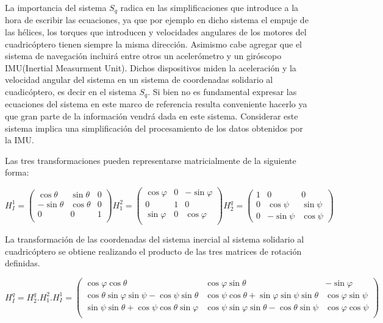 \documentclass[main]{subfiles}
\begin{document}
La importancia del sistema $S_q$ radica en las simplificaciones que introduce a la hora de escribir las ecuaciones, ya que por ejemplo en dicho sistema el empuje de las h\'elices, los torques que introducen y velocidades angulares de los motores del cuadric\'optero tienen siempre la misma direcci\'on. Asimismo cabe agregar que el sistema de navegaci\'on incluir\'a entre otros un aceler\'ometro y un gir\'oscopo IMU(Inertial Measurment Unit). Dichos dispositivos miden la aceleraci\'on y la velocidad angular del sistema en un sistema de coordenadas solidario al cuadic\'optero, es decir en el sistema $S_q$. Si bien no es fundamental expresar las ecuaciones del sistema en este marco de referencia resulta conveniente hacerlo ya que gran parte de la informaci\'on vendr\'a dada en este sistema. Considerar este sistema implica una simplificaci\'on del procesamiento de los datos obtenidos por la IMU. 

Las tres transformaciones pueden representarse matricialmente de la siguiente forma: 

$$
H_I^1=\left(\begin{array}{ccc}
  \cos\theta&\sin\theta&0\\
  -\sin\theta&\cos\theta&0\\
  0&0&1\\
  \end{array}\right)   H_1^2=\left(\begin{array}{ccc}
  \cos\varphi&0& -\sin\varphi\\
  0&1&0\\
  \sin\varphi&0&\cos\varphi\\
  
  \end{array}\right)  H_2^q=\left(\begin{array}{ccc}
   1&0&0\\  
  0&\cos\psi&\sin\psi\\
  0&-\sin\psi&\cos\psi  
  
  \end{array}\right) 
$$



La transformaci\'on de las coordenadas del sistema inercial al sistema solidario al cuadric\'optero se obtiene realizando el producto de las tres matrices de rotaci\'on definidas.

\begin{footnotesize}
$$
H_I^q=H_2^q.H_1^2.H_I^1=\left(\begin{array}{ccc}
\cos\varphi\cos\theta& \cos\varphi\sin\theta& -\sin\varphi\\
 \cos\theta\sin\varphi\sin\psi -\cos\psi\sin\theta &\cos \psi \cos \theta+ \sin\varphi\sin\psi\sin\theta& \cos\varphi\sin\psi\\
\sin\psi\sin\theta + \cos\psi\cos\theta\sin\varphi&  \cos\psi\sin\varphi\sin\theta- \cos\theta\sin\psi & \cos\varphi\cos\psi\\
\end{array} \right)
$$
\end{footnotesize}
 
\end{document}
